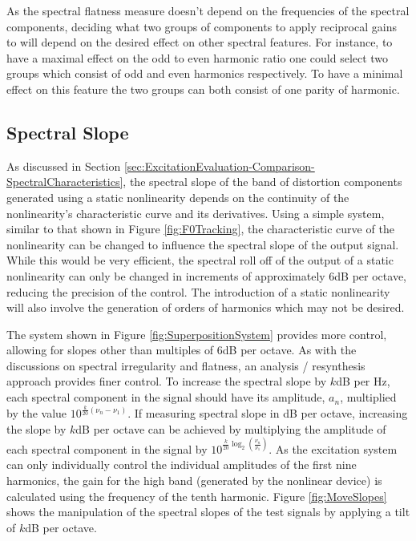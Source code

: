 		As the spectral flatness measure doesn't depend on the frequencies of the spectral components, deciding
		what two groups of components to apply reciprocal gains to will depend on the desired effect on other
		spectral features. For instance, to have a maximal effect on the odd to even harmonic ratio one could
		select two groups which consist of odd and even harmonics respectively. To have a minimal effect on this
		feature the two groups can both consist of one parity of harmonic.

	\subsection{Spectral Slope}
	\label{sec:FeatureControl-Parameterisation-Slope}
		As discussed in Section \ref{sec:ExcitationEvaluation-Comparison-SpectralCharacteristics}, the spectral
		slope of the band of distortion components generated using a static nonlinearity depends on the continuity
		of the nonlinearity's characteristic curve and its derivatives. Using a simple system, similar to that
		shown in Figure \ref{fig:F0Tracking}, the characteristic curve of the nonlinearity can be changed to
		influence the spectral slope of the output signal. While this would be very efficient, the spectral roll
		off of the output of a static nonlinearity can only be changed in increments of approximately 6dB per
		octave, reducing the precision of the control. The introduction of a static nonlinearity will also involve
		the generation of orders of harmonics which may not be desired.

		The system shown in Figure \ref{fig:SuperpositionSystem} provides more control, allowing for slopes other
		than multiples of 6dB per octave. As with the discussions on spectral irregularity and flatness, an
		analysis / resynthesis approach provides finer control. To increase the spectral slope by $k$dB per Hz,
		each spectral component in the signal should have its amplitude, $a_{n}$, multiplied by the value
		$10^{\frac{k}{20}(\nu_{n} - \nu_{1})}$. If measuring spectral slope in dB per octave, increasing the slope
		by $k$dB per octave can be achieved by multiplying the amplitude of each spectral component in the signal
		by $10^{\frac{k}{20}\log_{2} \left( \frac{\nu_{n}}{\nu_{1}} \right)}$. As the excitation system can only
		individually control the individual amplitudes of the first nine harmonics, the gain for the high band
		(generated by the nonlinear device) is calculated using the frequency of the tenth harmonic. Figure
		\ref{fig:MoveSlopes} shows the manipulation of the spectral slopes of the test signals by applying a tilt
		of $k$dB per octave.

